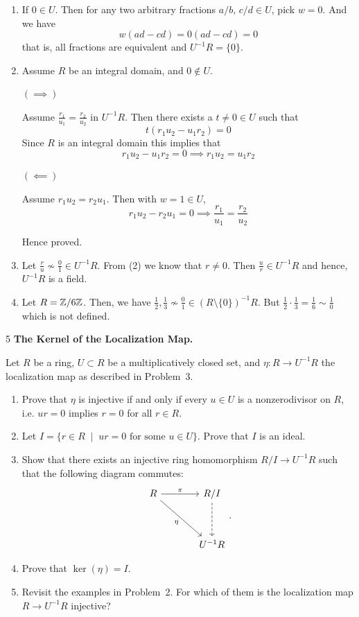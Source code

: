 \documentclass[Notebook.tex]{subfiles}
\begin{document}
\begin{solution}
	\bbni
	\begin{enumerate}
		\item If $0 \in U$. Then for any two arbitrary fractions $a/b, \, c/d \in U$, pick $w = 0$. And we have
		\[w(ad - cd) = 0 (ad - cd) = 0\]
		that is, all fractions are equivalent and $U^{-1}R = \{0\}$. 

		\item Assume $R$ be an integral domain, and $0 \notin U$.
		
		$(\implies)$ 

		Assume $\frac{r_1}{u_1}=\frac{r_2}{u_2}$ in $U^{-1}R$. Then there exists a $t \neq 0 \in U$ such that 
		\[t(r_1u_2 - u_1r_2) = 0\]
		Since $R$ is an integral domain this implies that 
		\[r_1u_2 - u_1r_2 = 0 \implies r_1u_2 = u_1r_2  \]


		$(\impliedby)$ 

		Assume $r_1u_2=r_2u_1$. 
		Then with $w =1 \in U$, 
		\[r_1u_2 - r_2u_1 =0 \implies \frac{r_1}{u_1} = \frac{r_2}{u_2}\]

		Hence proved. 

		\item Let $\frac{r}{u} \nsim \frac{0}{1}\in U^{-1}R$. From (2) we know that $r \neq 0$. Then $\frac{u}{r} \in U^{-1}R$ and hence, $U^{-1}R$ is a field. 
		
		\item Let $R = \mathbb Z/6\mathbb Z$. Then, we have $\frac{1}{2}, \frac{1}{3} \nsim \frac{0}{1} \in (R \setminus \{0\})^{-1}R$. But $\frac{1}{2} \cdot \frac{1}{3} = \frac{1}{6} \sim \frac{1}{0}$ which is not defined.  
	\end{enumerate}
\end{solution}

\newpage 

\begin{problem}{5}
	\textbf{The Kernel of the Localization Map.} 
	
	Let $R$ be a ring, $U\subset R$ be a multiplicatively closed set, and $\eta:R \to U^{-1}R$ the localization map as described in Problem~3.
	\begin{enumerate}
		\item Prove that $\eta$ is injective if and only if every $u\in U$ is a nonzerodivisor on $R$, i.e. $ur=0$ implies $r=0$ for all $r\in R$.	
		\item Let $I=\{r \in R \;\; | \;\; ur = 0 \text{ for some $u \in U$}\}$. Prove that $I$ is an ideal. 
		\item Show that there exists an injective ring homomorphism $R/I \to U^{-1}R$ such that the following diagram commutes:
		\[
		\begin{tikzcd}[row sep = 3.5em, column sep = 3.5em]
		R \arrow[r, "\pi"] \arrow[dr, swap,"\eta"] & R/I \arrow[d,dashed] \\
		& U^{-1}R
		\end{tikzcd}.
		\]
		\item Prove that $\ker(\eta)=I$. 
		\item  Revisit the examples in Problem~2. For which of them is the localization map $R\to U^{-1}R$ injective?
	\end{enumerate}
\end{problem}
\end{document}
